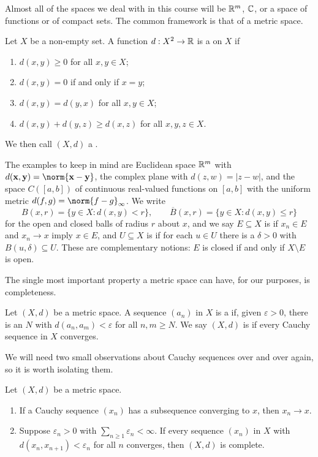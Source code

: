 \documentclass[a4paper]{scrartcl}
\begin{document}
Almost all of the spaces we deal with in this course will be $\mathbb{R}^m$, $\mathbb{C}$, or a space of functions or of compact sets. The common framework is that of a metric space.

\begin{definition}
	Let $X$ be a non-empty set. A function $d: X^2 \to \mathbb{R}$ is a  on $X$ if
	\begin{enumerate}[label=(\roman*)]
		\item $d(x,y) \geq 0$ for all $x, y \in X$;
		\item $d(x,y) = 0$ if and only if $x = y$;
		\item $d(x,y) = d(y,x)$ for all $x,y \in X$;
		\item $d(x,y) + d(y,z) \geq d(x,z)$ for all $x,y,z \in X$.
	\end{enumerate}
	We then call $(X,d)$ a .
\end{definition}

The examples to keep in mind are Euclidean space $\mathbb{R}^m$ with $d(\vv{x},\vv{y}) = \norm{\vv{x}-\vv{y}}$, the complex plane with $d(z,w) = |z-w|$, and the space $C([a,b])$ of continuous real-valued functions on $[a,b]$ with the uniform metric $d(f,g) = \norm{f-g}_\infty$. We write
$$B(x,r) = \{y \in X : d(x,y) < r\}, \qquad \overline{B}(x,r) = \{y \in X : d(x,y) \leq r\}$$
for the open and closed balls of radius $r$ about $x$, and we say $E \subseteq X$ is  if $x_n \in E$ and $x_n \to x$ imply $x \in E$, and $U \subseteq X$ is  if for each $u \in U$ there is a $\delta > 0$ with $B(u,\delta) \subseteq U$. These are complementary notions: $E$ is closed if and only if $X \setminus E$ is open.

The single most important property a metric space can have, for our purposes, is completeness.

\begin{definition}
	Let $(X,d)$ be a metric space. A sequence $(a_n)$ in $X$ is a  if, given $\varepsilon > 0$, there is an $N$ with $d(a_n,a_m) < \varepsilon$ for all $n,m \geq N$. We say $(X,d)$ is  if every Cauchy sequence in $X$ converges.
\end{definition}

We will need two small observations about Cauchy sequences over and over again, so it is worth isolating them.

\begin{lemma}\label{lem:cauchy-tricks}
	Let $(X,d)$ be a metric space.
	\begin{enumerate}[label=(\roman*)]
		\item If a Cauchy sequence $(x_n)$ has a subsequence converging to $x$, then $x_n \to x$.
		\item Suppose $\varepsilon_n > 0$ with $\sum_{n \geq 1} \varepsilon_n < \infty$. If every sequence $(x_n)$ in $X$ with $d(x_n, x_{n+1}) < \varepsilon_n$ for all $n$ converges, then $(X,d)$ is complete.
	\end{enumerate}
\end{lemma}
\end{document}
